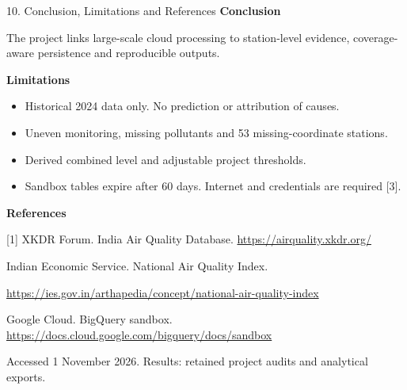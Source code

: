\documentclass[aspectratio=169,10pt]{beamer}
\begin{document}
\begin{frame}{10. Conclusion, Limitations and References}
\textbf{Conclusion}\par
The project links large-scale cloud processing to station-level evidence, coverage-aware persistence and reproducible outputs.\par
\medskip
\textbf{Limitations}
\begin{itemize}
\item Historical 2024 data only. No prediction or attribution of causes.
\item Uneven monitoring, missing pollutants and 53 missing-coordinate stations.
\item Derived combined level and adjustable project thresholds.
\item Sandbox tables expire after 60 days. Internet and credentials are required [3].
\end{itemize}
\medskip
\textbf{References}\par\scriptsize
[1] XKDR Forum. India Air Quality Database. \url{https://airquality.xkdr.org/}\par
[2] Indian Economic Service. National Air Quality Index.\par
\url{https://ies.gov.in/arthapedia/concept/national-air-quality-index}\par
[3] Google Cloud. BigQuery sandbox. \url{https://docs.cloud.google.com/bigquery/docs/sandbox}\par
\vspace{1mm}Accessed 1 November 2026. Results: retained project audits and analytical exports.
\end{frame}
\end{document}

